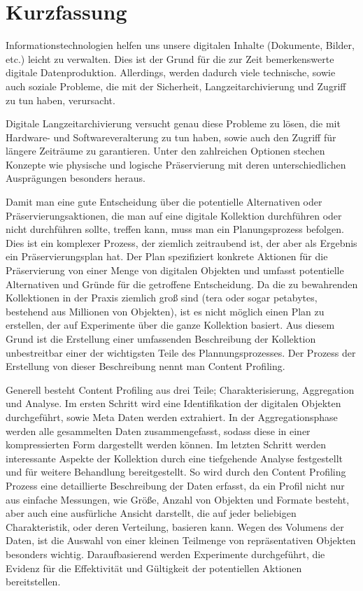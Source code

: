 \chapter*{Kurzfassung}
\vspace{-1cm}
Informationstechnologien helfen uns unsere digitalen Inhalte (Dokumente, Bilder, etc.) leicht zu verwalten.
Dies ist der Grund f\"{u}r die zur Zeit bemerkenswerte digitale Datenproduktion.
Allerdings, werden dadurch viele technische, sowie auch soziale Probleme, die mit der Sicherheit, Langzeitarchivierung und Zugriff zu tun haben, verursacht.

Digitale Langzeitarchivierung versucht genau diese Probleme zu l\"{o}sen, die mit Hardware- und Softwareveralterung zu tun haben, sowie auch den Zugriff f\"{u}r l\"{a}ngere Zeitr\"{a}ume zu garantieren.
Unter den zahlreichen Optionen stechen Konzepte wie physische und logische Pr\"{a}servierung mit deren unterschiedlichen Auspr\"{a}gungen besonders heraus.

Damit man eine gute Entscheidung \"{u}ber die potentielle Alternativen oder Pr\"{a}servierungsaktionen, die man auf eine digitale Kollektion durchf\"{u}hren oder nicht durchf\"{u}hren sollte, treffen kann, muss man ein Planungsprozess befolgen.
Dies ist ein komplexer Prozess, der ziemlich zeitraubend ist, der aber als Ergebnis ein Pr\"{a}servierungsplan hat.
Der Plan spezifiziert konkrete Aktionen f\"{u}r die Pr\"{a}servierung von einer Menge von digitalen Objekten und umfasst potentielle Alternativen und Gr\"{u}nde f\"{u}r die getroffene Entscheidung.
Da die zu bewahrenden Kollektionen in der Praxis ziemlich gro{\ss} sind (tera oder sogar petabytes, bestehend aus Millionen von Objekten), ist es nicht m\"{o}glich einen Plan zu erstellen, der auf Experimente \"{u}ber die ganze Kollektion basiert.
Aus diesem Grund ist die Erstellung einer umfassenden Beschreibung der Kollektion unbestreitbar einer der wichtigsten Teile des Plannungsprozesses.
Der Prozess der Erstellung von dieser Beschreibung nennt man Content Profiling.

Generell besteht Content Profiling aus drei Teile; Charakterisierung, Aggregation und Analyse.
Im ersten Schritt wird eine Identifikation der digitalen Objekten durchgef\"{u}hrt, sowie Meta Daten werden extrahiert.
In der Aggregationsphase werden alle gesammelten Daten zusammengefasst, sodass diese in einer kompressierten Form dargestellt werden k\"{o}nnen.
Im letzten Schritt werden interessante Aspekte der Kollektion durch eine tiefgehende Analyse festgestellt und f\"{u}r weitere Behandlung bereitgestellt. 
So wird durch den Content Profiling Prozess eine detaillierte Beschreibung der Daten erfasst, da ein Profil nicht nur aus einfache Messungen, wie Gr\"{o}{\ss}e, Anzahl von Objekten und Formate besteht, aber auch eine ausf\"{u}rliche Ansicht darstellt, die auf jeder beliebigen Charakteristik, oder deren Verteilung, basieren kann.
Wegen des Volumens der Daten, ist die Auswahl von einer kleinen Teilmenge von repr\"{a}sentativen Objekten besonders wichtig.
Daraufbasierend werden Experimente durchgef\"{u}hrt, die Evidenz f\"{u}r die Effektivit\"{a}t und G\"{u}ltigkeit der potentiellen Aktionen bereitstellen.

